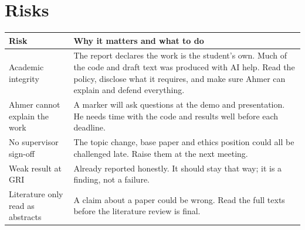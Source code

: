 \documentclass[11pt,a4paper]{article}
\begin{document}
\section{Risks}
\begin{tabularx}{\linewidth}{@{}P{5.4cm}L@{}}
\toprule
\textbf{Risk} & \textbf{Why it matters and what to do} \\
\midrule
Academic integrity & The report declares the work is the student's own. Much of the code and draft text was produced with AI help. Read the policy, disclose what it requires, and make sure Ahmer can explain and defend everything. \\
Ahmer cannot explain the work & A marker will ask questions at the demo and presentation. He needs time with the code and results well before each deadline. \\
No supervisor sign-off & The topic change, base paper and ethics position could all be challenged late. Raise them at the next meeting. \\
Weak result at GRI & Already reported honestly. It should stay that way; it is a finding, not a failure. \\
Literature only read as abstracts & A claim about a paper could be wrong. Read the full texts before the literature review is final. \\
\bottomrule
\end{tabularx}
\end{document}
